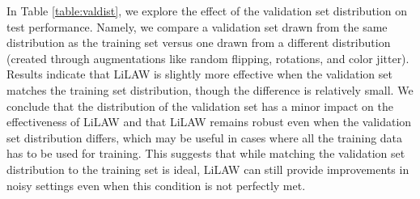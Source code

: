 \documentclass{article}
\theoremstyle{plain}
\theoremstyle{definition}
\theoremstyle{remark}
\begin{document}
In Table \ref{table:valdist}, we explore the effect of the validation set distribution on test performance. Namely, we compare a validation set drawn from the same distribution as the training set versus one drawn from a different distribution (created through augmentations like random flipping, rotations, and color jitter). Results indicate that LiLAW is slightly more effective when the validation set matches the training set distribution, though the difference is relatively small. We conclude that the distribution of the validation set has a minor impact on the effectiveness of LiLAW and that LiLAW remains robust even when the validation set distribution differs, which may be useful in cases where all the training data has to be used for training. This suggests that while matching the validation set distribution to the training set is ideal, LiLAW can still provide improvements in noisy settings even when this condition is not perfectly met.
\end{document}
